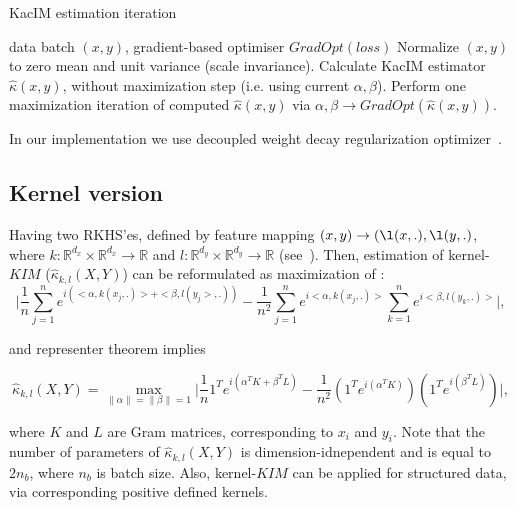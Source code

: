 \documentclass{article}
\begin{document}
\begin{algorithm}
\caption{KacIM estimation iteration}\label{alg:estimator_computation}
\begin{algorithmic}
\Require data batch $(x,y)$, gradient-based optimiser $GradOpt(loss)$
\State Normalize $(x,y)$ to zero mean and unit variance (scale invariance).
\State Calculate KacIM estimator $\hat{\kappa}(x,y)$, without maximization step (i.e. using current $\alpha, \beta$).
\State Perform one maximization iteration of computed $\hat{\kappa}(x,y)$ via $\alpha, \beta \rightarrow GradOpt(\hat{\kappa}(x,y))$.
\end{algorithmic}
\end{algorithm}
In our implementation we use decoupled weight decay regularization optimizer~\cite{Loshchilov2019DecoupledWD}.

\subsection{Kernel version}

Having two RKHS'es, defined by feature mapping $(x,y) \rightarrow (\l(x,.), \l(y,.)$, where $k: \mathbb{R}^{d_{x}} \times \mathbb{R}^{d_{x}} \rightarrow \mathbb{R}$ and $l: \mathbb{R}^{d_{y}} \times \mathbb{R}^{d_{y}} \rightarrow \mathbb{R}$ (see~\cite{10.5555/3279302}). Then, estimation of kernel-$KIM$ ($\hat{\kappa}_{k,l} (X,Y)$) can be reformulated as maximization of :
\begin{equation}
\label{eq:kernel_estimator}
    \vert \frac{1}{n} \sum_{j=1}^{n} e^{i(<\alpha, k(x_{j},.)> + <\beta, l(y_{j}>,.)) } - \frac{1}{n^2} \sum_{j=1}^{n} e^{i <\alpha, k(x_{j},.)>}\sum_{k=1}^{n} e^{i<\beta, l(y_{k},.)>}\vert,
\end{equation}

and representer theorem\cite{?} implies 

\begin{equation}
\label{eq:kernel_estimator1}
    \hat{\kappa}_{k,l} (X,Y) = \max_{\|\alpha\| = \|\beta\| = 1} \vert \frac{1}{n} 1^{T} e^{i(\alpha^{T} K + \beta^{T} L)} - \frac{1}{n^2} (1^{T} e^{i(\alpha^{T}K)}) (1^{T} e^{i(\beta^{T}L)}) \vert,
\end{equation}

where $K$ and $L$ are Gram matrices, corresponding to $x_{i}$ and $y_{i}$. Note that the number of parameters of $\hat{\kappa}_{k,l} (X,Y)$ is dimension-idnependent and is equal to $2n_{b}$, where $n_{b}$ is batch size. Also, kernel-$KIM$ can be applied for structured data, via corresponding positive defined kernels.
\end{document}
